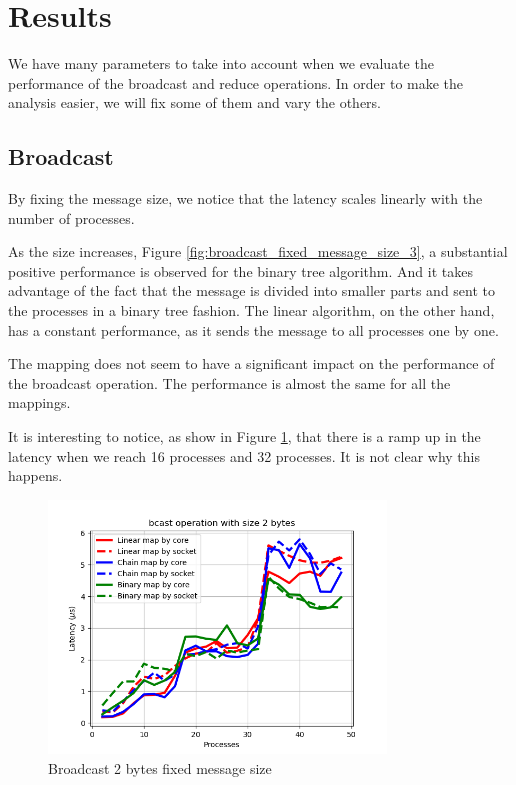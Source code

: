 \section{Results}

We have many parameters to take into account when we evaluate the performance of the broadcast and reduce operations. In order to make the analysis easier, we will fix some of them and vary the others.

\subsection{Broadcast}

By fixing the message size, we notice that the latency scales linearly with the number of processes.

As the size increases, Figure \ref{fig:broadcast_fixed_message_size_3}, a substantial positive performance is observed for the binary tree algorithm. And it takes advantage of the fact that the message is divided into smaller parts and sent to the processes in a binary tree fashion. The linear algorithm, on the other hand, has a constant performance, as it sends the message to all processes one by one.

The mapping does not seem to have a significant impact on the performance of the broadcast operation. The performance is almost the same for all the mappings.

It is interesting to notice, as show in Figure \ref{fig:broadcast_fixed_message_size_2}, that there is a ramp up in the latency when we reach 16 processes and 32 processes. It is not clear why this happens.

\begin{figure}[h!]
    \centering
    \includegraphics[width=0.8\textwidth]{../plots/bcast_fixedSize2.png}
    \caption{Broadcast 2 bytes fixed message size}
    \label{fig:broadcast_fixed_message_size_2}
\end{figure}

